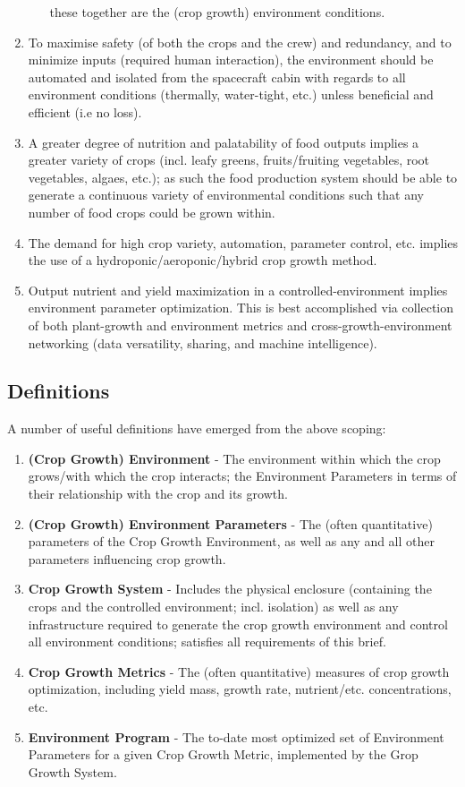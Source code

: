 \documentclass{report}
\begin{document}
\begin{enumerate}
\begin{enumerate}
        these together are the (crop growth) environment conditions.
    \end{enumerate}
\item To maximise safety (of both the crops and the crew) and redundancy, and to minimize 
    inputs (required human interaction), the environment should be automated and isolated 
    from the spacecraft cabin with regards to all environment conditions (thermally, 
    water-tight, etc.) unless beneficial and efficient (i.e no loss).
\item A greater degree of nutrition and palatability of food outputs implies a greater 
    variety of crops (incl. leafy greens, fruits/fruiting vegetables, root vegetables, 
    algaes, etc.); as such the food production system should be able to generate a 
    continuous variety of environmental conditions such that any number of food crops 
    could be grown within.
\item The demand for high crop variety, automation, parameter control, etc. implies 
    the use of a hydroponic/aeroponic/hybrid crop growth method.
\item Output nutrient and yield maximization in a controlled-environment implies environment
    parameter optimization. This is best accomplished via collection of both plant-growth and 
    environment metrics and cross-growth-environment networking 
    (data versatility, sharing, and machine intelligence).
\end{enumerate}

\newpage

\subsection{Definitions}
\label{sec:definitions}
A number of useful definitions have emerged from the above scoping:

\begin{enumerate}
\item \textbf{(Crop Growth) Environment} - The environment within which the crop grows/with which 
the crop interacts; the Environment Parameters in terms of their relationship with the 
crop and its growth.
\item \textbf{(Crop Growth) Environment Parameters} - The (often quantitative) parameters of the 
Crop Growth Environment, as well as any and all other parameters influencing crop growth.
\item \textbf{Crop Growth System} - Includes the physical enclosure (containing the crops and the 
controlled environment; incl. isolation) as well as any infrastructure required to 
generate the crop growth environment and control all environment conditions; satisfies 
all requirements of this brief.
\item \textbf{Crop Growth Metrics} - The (often quantitative) measures of crop growth optimization,
    including yield mass, growth rate, nutrient/etc. concentrations, etc.
\item \textbf{Environment Program} - The to-date most optimized set of Environment Parameters 
for a given Crop Growth Metric, implemented by the Grop Growth System.
\end{enumerate}
\end{document}
